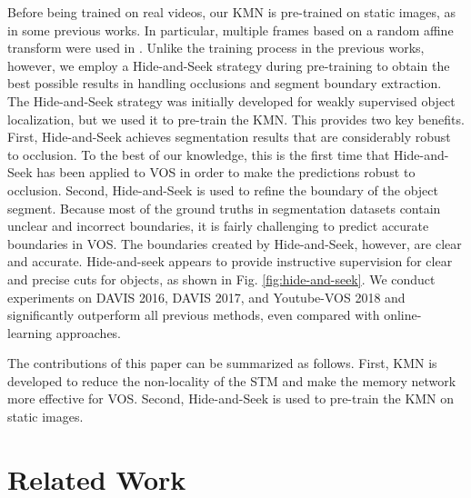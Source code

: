 Before being trained on real videos, our KMN is pre-trained on static images, as in some previous works. In particular, multiple frames based on a random affine transform were used in \cite{wug2018fast,Oh_2019_ICCV}. Unlike the training process in the previous works, however, we employ a Hide-and-Seek strategy during pre-training to obtain the best possible results in handling occlusions and segment boundary extraction. The Hide-and-Seek strategy \cite{singh2017hide} was initially developed for weakly supervised object localization, but we used it to pre-train the KMN. This provides two key benefits. First, Hide-and-Seek achieves segmentation results that are considerably robust to occlusion. To the best of our knowledge, this is the first time that Hide-and-Seek has been applied to VOS in order to make the predictions robust to occlusion. Second, Hide-and-Seek is used to refine the boundary of the object segment. Because most of the ground truths in segmentation datasets contain unclear and incorrect boundaries, it is fairly challenging to predict accurate boundaries in VOS. The boundaries created by Hide-and-Seek, however, are clear and accurate. Hide-and-seek appears to provide instructive supervision for clear and precise cuts for objects, as shown in Fig. \ref{fig:hide-and-seek}. We conduct experiments on DAVIS 2016, DAVIS 2017, and Youtube-VOS 2018 and significantly outperform all previous methods, even compared with online-learning approaches.

The contributions of this paper can be summarized as follows. First, KMN is developed to reduce the non-locality of the STM and make the memory network more effective for VOS. Second, Hide-and-Seek is used to pre-train the KMN on static images.

\section{Related Work}
\label{s2}

